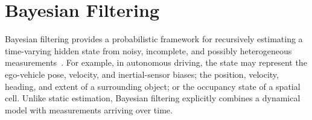 \documentclass[11pt,oneside,openany]{book}
\newcommand{\addednew}[1]{\textcolor{RevisionOlive}{#1}}
\begin{document}
%
%



\section{Bayesian Filtering}
%



Bayesian filtering provides a probabilistic framework for recursively estimating a time-varying hidden state from noisy, incomplete, and possibly heterogeneous measurements~\cite{sarkka2013_bayesian}. For example, in autonomous driving, the state may represent the ego-vehicle pose, velocity, and inertial-sensor biases; the position, velocity, heading, and extent of a surrounding object; or the occupancy state of a spatial cell. Unlike static estimation, Bayesian filtering explicitly combines a dynamical model with measurements arriving over time.
\end{document}
